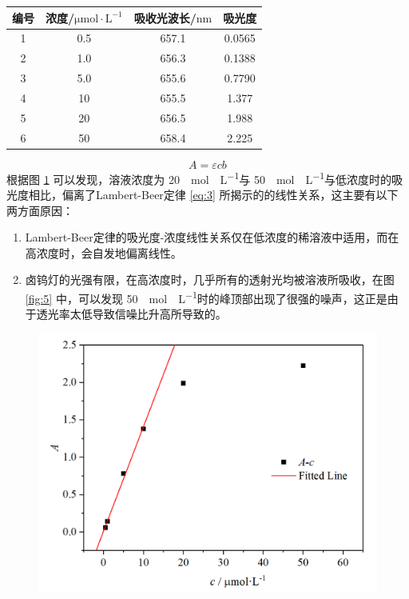 \begin{table}[H]
    \centering
    \begin{tabular}{cccc}
    \toprule
         编号 & 浓度/$\mathrm{\mu mol\cdot L^{-1}}$ & 吸收光波长/$\mathrm{nm}$ & 吸光度 \\
         \midrule
         1 & 0.5 & 657.1 & 0.0565 \\
         2 & 1.0 & 656.3 & 0.1388 \\
         3 & 5.0 & 655.6 & 0.7790 \\
         4 & 10 & 655.5 & 1.377 \\
         5 & 20 & 656.5 & 1.988 \\
         6 & 50 & 658.4 & 2.225 \\
         \bottomrule
    \end{tabular}
    \label{tab:3}
\end{table}
\begin{equation}\label{eq:3}
    A = \varepsilon c b
\end{equation}
根据图 \ref{fig:7} 可以发现，溶液浓度为 \SI{20}{\mu mol\cdot L^{-1}}与 \SI{50}{\mu mol\cdot L^{-1}}与低浓度时的吸光度相比，偏离了Lambert-Beer定律 \eqref{eq:3} 所揭示的的线性关系，这主要有以下两方面原因：
\begin{enumerate}
    \item Lambert-Beer定律的吸光度-浓度线性关系仅在低浓度的稀溶液中适用，而在高浓度时，会自发地偏离线性。
    \item 卤钨灯的光强有限，在高浓度时，几乎所有的透射光均被溶液所吸收，在图 \ref{fig:5} 中，可以发现 \SI{50}{\mu mol\cdot L^{-1}}时的峰顶部出现了很强的噪声，这正是由于透光率太低导致信噪比升高所导致的。
\end{enumerate}

\begin{figure}[H]
    \centering
    \includegraphics[width=.6\textwidth]{figures2/2-5.png}
    \label{fig:7}
\end{figure}

